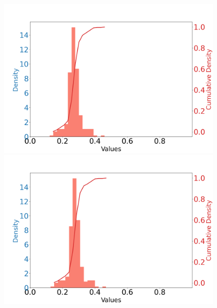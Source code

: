 \documentclass{article}
\begin{document}
\begin{figure}[htbp]
\begin{minipage}{0.195\textwidth}
    \end{minipage}
    \begin{minipage}{0.195\textwidth}
    \centering
    \includegraphics[scale=0.08]{figures/carry_density_idx_42_XCoord:0.31_YCoord:38.98.png}
    \end{minipage}
    \begin{minipage}{0.195\textwidth}
    \centering
    \includegraphics[scale=0.08]{figures/carry_density_idx_60_XCoord:-25.34_YCoord:12.82.png}
    \end{minipage}
    \begin{minipage}{0.195\textwidth}
    \centering

\end{minipage}
\end{figure}
\end{document}
